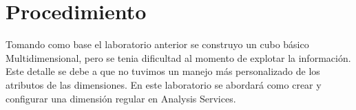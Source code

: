 \documentclass{article}
\begin{document}
\section{Procedimiento}

Tomando como base el laboratorio anterior se construyo un cubo básico Multidimensional, pero se tenia
dificultad al momento de explotar la información. Este detalle se debe a que no tuvimos un manejo más
personalizado de los atributos de las dimensiones. En este laboratorio se abordará como crear y configurar
una dimensión regular en Analysis Services.




\end{document}
